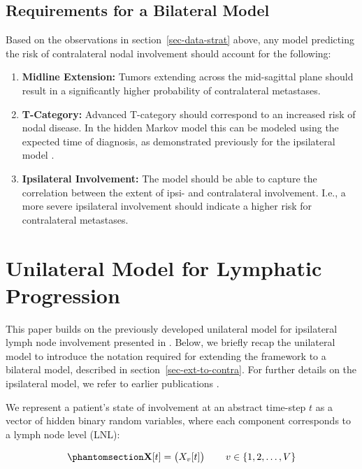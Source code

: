 \documentclass[
  sn-mathphys-num,
]{sn-jnl}
\providecommand{\tightlist}{%
  \setlength{\itemsep}{0pt}\setlength{\parskip}{0pt}}\usepackage{longtable,booktabs,array}
\begin{document}
\subsection{Requirements for a Bilateral Model}\label{sec-requirements}

Based on the observations in section~\ref{sec-data-strat} above, any
model predicting the risk of contralateral nodal involvement should
account for the following:

\begin{enumerate}
\def\labelenumi{\arabic{enumi}.}
\tightlist
\item
  \textbf{Midline Extension:} Tumors extending across the mid-sagittal
  plane should result in a significantly higher probability of
  contralateral metastases.
\item
  \textbf{T-Category:} Advanced T-category should correspond to an
  increased risk of nodal disease. In the hidden Markov model this can
  be modeled using the expected time of diagnosis, as demonstrated
  previously for the ipsilateral model \citep{ludwig_hidden_2021}.
\item
  \textbf{Ipsilateral Involvement:} The model should be able to capture
  the correlation between the extent of ipsi- and contralateral
  involvement. I.e., a more severe ipsilateral involvement should
  indicate a higher risk for contralateral metastases.
\end{enumerate}

\section{Unilateral Model for Lymphatic
Progression}\label{sec-unilateral}

This paper builds on the previously developed unilateral model for
ipsilateral lymph node involvement presented in
\citep{ludwig_modelling_2024}. Below, we briefly recap the unilateral
model to introduce the notation required for extending the framework to
a bilateral model, described in section~\ref{sec-ext-to-contra}. For
further details on the ipsilateral model, we refer to earlier
publications \citep{ludwig_hidden_2021, ludwig_modelling_2024}.

We represent a patient's state of involvement at an abstract time-step
\(t\) as a vector of hidden binary random variables, where each
component corresponds to a lymph node level (LNL):

\begin{equation}\phantomsection\label{eq-state-def}{
\mathbf{X}[t] = \begin{pmatrix} X_v[t] \end{pmatrix} \qquad v \in \left\{ 1, 2, \ldots, V \right\}
}\end{equation}
\end{document}
